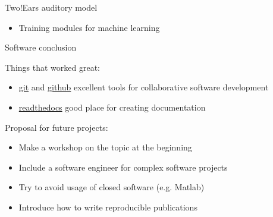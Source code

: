 \documentclass{beamer}
\begin{document}
\begin{frame}{Two!Ears auditory model}
\begin{minipage}[b]{0.56\columnwidth}
        \begin{itemize}
            \item Training modules for machine learning
        \end{itemize}

    \end{minipage}

\end{frame}

\begin{frame}{Software conclusion}

    Things that worked great:
    \begin{itemize}
        \item \href{https://git-scm.com}{git} and
            \href{https://github.com}{github} excellent tools for collaborative
            software development
        \item \href{https://readthedocs.org}{readthedocs} good place for
            creating documentation
    \end{itemize}

    \vspace{0.6cm}

    Proposal for future projects:
    \begin{itemize}
        \item Make a workshop on the topic at the beginning
        \item Include a software engineer for complex software projects
        \item Try to avoid usage of closed software (e.g. Matlab)
        \item Introduce how to write reproducible publications
    \end{itemize}

\end{frame}
\end{document}
